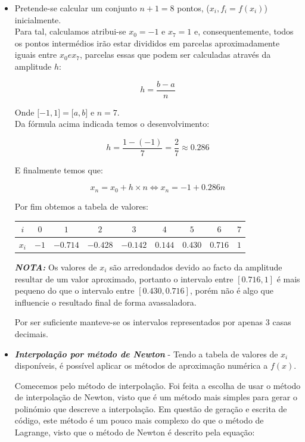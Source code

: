 \documentclass[12pt, letterpaper,fleqn]{article}
\begin{document}
\begin{itemize}
    \item Pretende-se calcular um conjunto $n+1 = 8$ pontos, ($x_i, f_i = f(x_i)$) inicialmente. \\
    
    Para tal, calculamos atribui-se $x_0 = -1$ e $x_7 = 1$ e, consequentemente, todos os pontos intermédios irão estar divididos em parcelas aproximadamente iguais entre $x_0 e x_7$, parcelas essas que podem ser calculadas através da amplitude $h$:

    \[h = \frac{b-a}{n}\]

    Onde $\mathopen[-1,1\mathclose] = \mathopen[a,b\mathclose]$ e $n = 7$. \\
    
    Da fórmula acima indicada temos o desenvolvimento:

    \[h = \frac{1-(-1)}{7} = \frac{2}{7} \approx 0.286\]

    E finalmente temos que:

    \[x_n = x_0 + h\times n \Leftrightarrow x_n = -1 + 0.286n\]

    Por fim obtemos a tabela de valores:
    
    \begin{center}
        \begin{tabular} {|| c | c | c | c | c | c | c | c | c ||} \hline
            $i$ & $0$ & $1$ & $2$ & $3$ & $4$ & $5$ & $6$ & $7$\\ [0.4ex]\hline
            $x_i$ & $-1$ & $-0.714$ & $-0.428$ & $-0.142$ & $0.144$ & $0.430$ & $0.716$ & $1$ \\ [0.4ex]\hline
        \end{tabular}
    \end{center}

    \textbf{\textit{NOTA:}} Os valores de $x_i$ são arredondados devido ao facto da amplitude resultar de um valor aproximado, portanto o intervalo entre $[0.716,1]$ é mais pequeno do que o intervalo entre $[0.430, 0.716]$, porém não é algo que influencie o resultado final de forma avassaladora.

    Por ser suficiente manteve-se os intervalos representados por apenas 3 casas decimais.

    \item \textbf{\textit{Interpolação por método de Newton}} - Tendo a tabela de valores de $x_i$ disponíveis, é possível aplicar os métodos de aproximação numérica a $f(x)$.

    Comecemos pelo método de interpolação. Foi feita a escolha de usar o método de interpolação de Newton, visto que é um método mais simples para gerar o polinómio que descreve a interpolação. Em questão de geração e escrita de código, este método é um pouco mais complexo do que o método de Lagrange, visto que o método de Newton é descrito pela equação:


\end{itemize}
\end{document}
